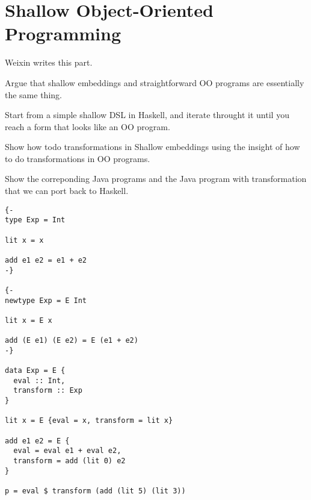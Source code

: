 \section{Shallow Object-Oriented Programming}

Weixin writes this part.

Argue that shallow embeddings and straightforward OO 
programs are essentially the same thing. 

Start from a simple shallow DSL in Haskell, 
and iterate throught it until you reach a form 
that looks like an OO program.

Show how todo transformations in Shallow embeddings
using the insight of how to do transformations in OO
programs.

Show the correponding Java programs and the Java program 
with transformation that we can port back to Haskell.

\begin{verbatim}
{-
type Exp = Int

lit x = x

add e1 e2 = e1 + e2
-}

{-
newtype Exp = E Int

lit x = E x

add (E e1) (E e2) = E (e1 + e2)
-}

data Exp = E {
  eval :: Int,
  transform :: Exp
}

lit x = E {eval = x, transform = lit x}

add e1 e2 = E {
  eval = eval e1 + eval e2,
  transform = add (lit 0) e2
}

p = eval $ transform (add (lit 5) (lit 3))
\end{verbatim}
